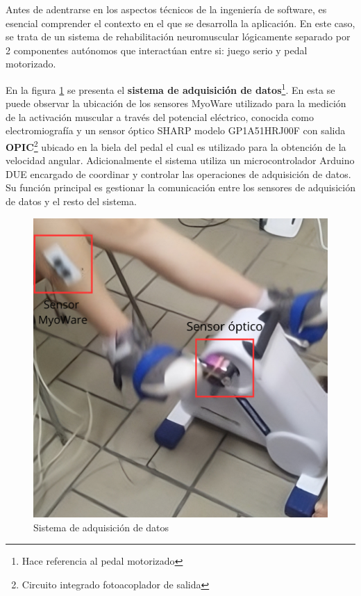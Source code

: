 Antes de adentrarse en los aspectos técnicos de la ingeniería de software, es esencial comprender el contexto en el que se desarrolla la aplicación. En este caso, se trata de un sistema de rehabilitación neuromuscular lógicamente separado por 2 componentes autónomos que interactúan entre si: juego serio y pedal motorizado. 

\vspace{5pt}
En la figura \ref{fig: sa} se presenta el \textbf{sistema de adquisición de datos}\footnote{Hace referencia al pedal motorizado}. En esta se puede observar la ubicación de los sensores MyoWare  utilizado para la medición de la activación muscular a través del potencial eléctrico, conocida como electromiografía y un sensor óptico SHARP modelo GP1A51HRJ00F con salida  \textbf{OPIC}\footnote{Circuito integrado fotoacoplador de salida} ubicado en la biela del pedal el cual es utilizado para la obtención de la velocidad angular. Adicionalmente el sistema utiliza un microcontrolador Arduino DUE encargado de coordinar y controlar las operaciones de adquisición de datos. Su función principal es gestionar la comunicación entre los sensores de adquisición de datos y el resto del sistema.

\begin{figure}[ht]
    \centering
    \includegraphics[scale=0.2]{images/sa.png}
    \caption{Sistema de adquisición de datos}
    \label{fig: sa}
\end{figure}    

